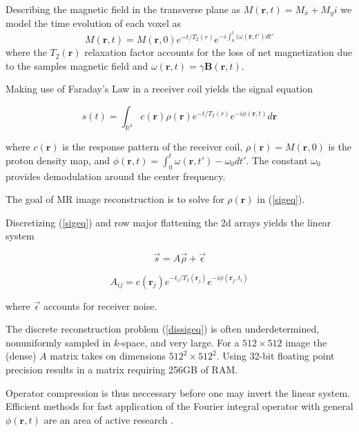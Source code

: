 \documentclass[11pt]{amsart}
\theoremstyle{remark}
\begin{document}
Describing the magnetic field in the transverse plane as $M(\mathbf{r},t) = M_x + M_yi$ we model the time evolution of each voxel as
\begin{equation}
M(\mathbf{r},t) = M(\mathbf{r},0) e^{-t/T_2(r)}e^{-i\int_0^t(\omega(\mathbf{r},t')dt'}
\end{equation} 
where the $T_2(\mathbf{r})$ relaxation factor accounts for the loss of net magnetization due to the samples magnetic field and $\omega(\mathbf{r},t) = \gamma \mathbf{B}(\mathbf{r},t)$.


Making use of Faraday's Law in a receiver coil yields the signal equation

\begin{equation}\label{sigeq}
s(t) = \int_{\mathbb{R}^2}c(\mathbf{r})\rho(\mathbf{r})e^{-t/T_2(r)}e^{-i\phi(\mathbf{r},t)}d\mathbf{r}
\end{equation}

where $c(\mathbf{r})$ is the response pattern of the receiver coil, $\rho(\mathbf{r}) = M(\mathbf{r},0)$ is the proton density map, and $\phi(\mathbf{r},t) = \int_0^t \omega(\mathbf{r},t') - \omega_0 dt'$. The constant $\omega_0$ provides demodulation around the center frequency.


The goal of MR image reconstruction is to solve for $\rho(\mathbf{r})$ in (\ref{sigeq}).



Discretizing (\ref{sigeq}) and row major flattening the 2d arrays yields the linear system

\begin{equation}\label{dissigeq}
\vec{s} = A \vec{\rho} + \vec{\epsilon}
\end{equation}

\begin{equation}
A_{ij} = c(\mathbf{r}_j)e^{-t_i/T_2(\mathbf{r}_j)}e^{-i\phi(\mathbf{r}_j,t_i)}
\end{equation}

where $\vec{\epsilon}$ accounts for receiver noise.


The discrete reconstruction problem (\ref{dissigeq}) is often underdetermined, nonuniformly sampled in $k$-space, and very large. For a $512 \times 512$ image the (dense) $A$ matrix takes on dimensions $512^2 \times 512^2$. Using 32-bit floating point precision results in a matrix requiring 256GB of RAM.

Operator compression is thus neccessary before one may invert the linear system. Efficient
methods for fast application of the Fourier integral operator with
general $\phi(\mathbf{r},t)$ are an area of active research \cite{Cand2006}. 
\end{document}
